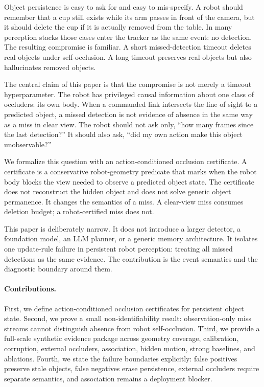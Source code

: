 \documentclass{article}
\begin{document}
Object persistence is easy to ask for and easy to mis-specify. A robot should
remember that a cup still exists while its arm passes in front of the camera,
but it should delete the cup if it is actually removed from the table. In many
perception stacks those cases enter the tracker as the same event: no detection.
The resulting compromise is familiar. A short missed-detection timeout deletes
real objects under self-occlusion. A long timeout preserves real objects but
also hallucinates removed objects.

The central claim of this paper is that the compromise is not merely a timeout
hyperparameter. The robot has privileged causal information about one class of
occluders: its own body. When a commanded link intersects the line of sight to a
predicted object, a missed detection is not evidence of absence in the same way
as a miss in clear view. The robot should not ask only, ``how many frames since
the last detection?'' It should also ask, ``did my own action make this object
unobservable?''

We formalize this question with an action-conditioned occlusion certificate. A
certificate is a conservative robot-geometry predicate that marks when the
robot body blocks the view needed to observe a predicted object state. The
certificate does not reconstruct the hidden object and does not solve generic
object permanence. It changes the semantics of a miss. A clear-view miss
consumes deletion budget; a robot-certified miss does not.

This paper is deliberately narrow. It does not introduce a larger detector, a
foundation model, an LLM planner, or a generic memory architecture. It isolates
one update-rule failure in persistent robot perception: treating all missed
detections as the same evidence. The contribution is the event semantics and
the diagnostic boundary around them.

\paragraph{Contributions.}
First, we define action-conditioned occlusion certificates for persistent object
state. Second, we prove a small non-identifiability result: observation-only
miss streams cannot distinguish absence from robot self-occlusion. Third, we
provide a full-scale synthetic evidence package across geometry coverage,
calibration, corruption, external occluders, association, hidden motion, strong
baselines, and ablations. Fourth, we state the failure boundaries explicitly:
false positives preserve stale objects, false negatives erase persistence,
external occluders require separate semantics, and association remains a
deployment blocker.
\end{document}
